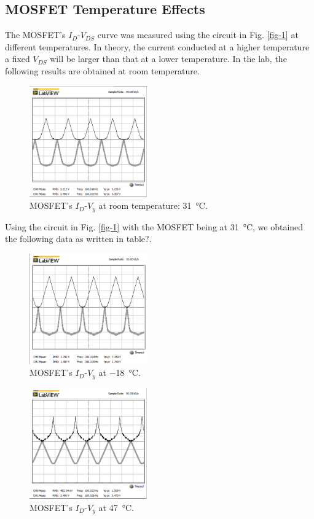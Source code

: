 \documentclass[journal]{IEEEtran}
\begin{document}
\subsection{MOSFET Temperature Effects}
\par The MOSFET’s $I_{D}$-$V_{DS}$ curve was measured using the circuit in Fig. \ref{fig-1}
at different temperatures. In theory, the current conducted at a higher temperature
a fixed $V_{DS}$ will be larger than that at a lower temperature. In the lab, the
following results are obtained at room temperature.
\begin{figure}[h]
  \centering
  \includegraphics[width=0.45\textwidth]{images/2-1.png}
  \caption{MOSFET’s $I_{D}$-$V_{y}$ at room temperature: \SI{31}{\celsius}.}
  \label{fig-5}
\end{figure}
\par Using the circuit in  Fig. \ref{fig-1} with the MOSFET being at \SI{31}{\celsius},
we obtained the following data as written in table?.
\begin{figure}[h]
  \centering
  \includegraphics[width=0.45\textwidth]{images/2-2.png}
  \caption{MOSFET’s $I_{D}$-$V_{y}$ at \SI{-18}{\celsius}.}
  \label{fig-6}
\end{figure}
\begin{figure}[h]
  \centering
  \includegraphics[width=0.45\textwidth]{images/2-3.png}
  \caption{MOSFET’s $I_{D}$-$V_{y}$ at \SI{47}{\celsius}.}
  \label{fig-7}
\end{figure}
\end{document}
